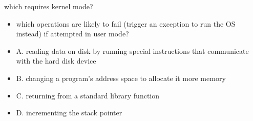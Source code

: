 \begin{frame}{which requires kernel mode?}
\begin{itemize}
\item which operations are likely to fail (trigger an exception to run the OS instead)
if attempted in user mode?
\vspace{.5cm}
\item A. reading data on disk by running special instructions that communicate with the hard disk device
\item B. changing a program's address space to allocate it more memory
\item C. returning from a standard library function
\item D. incrementing the stack pointer
\end{itemize}
\end{frame}
